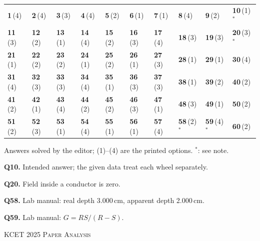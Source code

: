 {\small\setlength{\tabcolsep}{1pt}\renewcommand{\arraystretch}{1.5}
\begin{tabularx}{\linewidth}{@{}*{10}{>{\centering\arraybackslash}X}@{}}\toprule
\textbf{1}\,(4) & \textbf{2}\,(4) & \textbf{3}\,(3) & \textbf{4}\,(4) & \textbf{5}\,(2) & \textbf{6}\,(1) & \textbf{7}\,(1) & \textbf{8}\,(4) & \textbf{9}\,(2) & \textbf{10}\,(1)$^{*}$\\
\textbf{11}\,(3) & \textbf{12}\,(2) & \textbf{13}\,(1) & \textbf{14}\,(4) & \textbf{15}\,(2) & \textbf{16}\,(3) & \textbf{17}\,(4) & \textbf{18}\,(3) & \textbf{19}\,(3) & \textbf{20}\,(3)$^{*}$\\
\textbf{21}\,(1) & \textbf{22}\,(2) & \textbf{23}\,(2) & \textbf{24}\,(1) & \textbf{25}\,(2) & \textbf{26}\,(1) & \textbf{27}\,(3) & \textbf{28}\,(1) & \textbf{29}\,(1) & \textbf{30}\,(4)\\
\textbf{31}\,(4) & \textbf{32}\,(3) & \textbf{33}\,(3) & \textbf{34}\,(4) & \textbf{35}\,(1) & \textbf{36}\,(3) & \textbf{37}\,(3) & \textbf{38}\,(1) & \textbf{39}\,(2) & \textbf{40}\,(2)\\
\textbf{41}\,(2) & \textbf{42}\,(1) & \textbf{43}\,(4) & \textbf{44}\,(2) & \textbf{45}\,(2) & \textbf{46}\,(3) & \textbf{47}\,(1) & \textbf{48}\,(3) & \textbf{49}\,(1) & \textbf{50}\,(2)\\
\textbf{51}\,(2) & \textbf{52}\,(3) & \textbf{53}\,(1) & \textbf{54}\,(4) & \textbf{55}\,(1) & \textbf{56}\,(1) & \textbf{57}\,(4) & \textbf{58}\,(2)$^{*}$ & \textbf{59}\,(4)$^{*}$ & \textbf{60}\,(2)\\\bottomrule\end{tabularx}}\par\smallskip
{\footnotesize Answers solved by the editor; (1)--(4) are the printed options. $^{*}$: see note.\par
\par\smallskip\textbf{Q10.} Intended answer; the given data treat each wheel separately.
\par\smallskip\textbf{Q20.} Field inside a conductor is zero.
\par\smallskip\textbf{Q58.} Lab manual: real depth 3.000\,cm, apparent depth 2.000\,cm.
\par\smallskip\textbf{Q59.} Lab manual: $G = RS/(R-S)$.
}\par
\clearpage
\begin{center}{}\par
{\fontsize{20}{24}\selectfont\color{navy}\scshape KCET 2025 \textperiodcentered{} Paper Analysis}\par
{\color{gilt}}\end{center}
